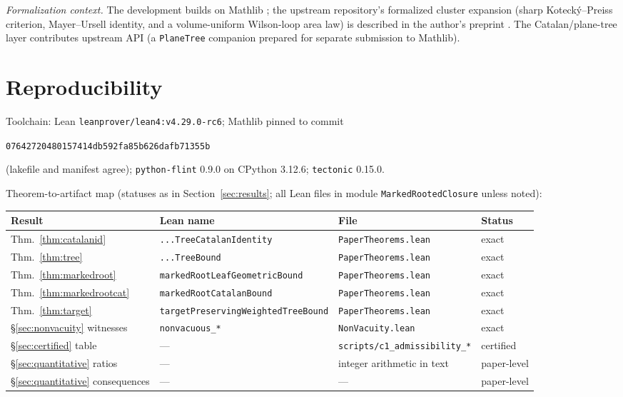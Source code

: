 \documentclass[11pt]{article}
\newcommand{\lean}[1]{\texttt{#1}}
\begin{document}
\emph{Formalization context.}  The development builds on Mathlib
\cite{mathlib20}; the upstream repository's formalized cluster
expansion (sharp Kotecký--Preiss criterion, Mayer--Ursell identity,
and a volume-uniform Wilson-loop area law) is described in the
author's preprint \cite{Eriksson26b}.  The Catalan/plane-tree layer
contributes upstream API (a \lean{PlaneTree} companion prepared for
separate submission to Mathlib).

\section{Reproducibility}\label{sec:repro}

Toolchain: Lean \lean{leanprover/lean4:v4.29.0-rc6}; Mathlib pinned
to commit
\begin{center}\small
\lean{07642720480157414db592fa85b626dafb71355b}
\end{center}
\noindent (lakefile and manifest agree); \lean{python-flint} 0.9.0 on
CPython 3.12.6; \lean{tectonic} 0.15.0.

\medskip
\noindent Theorem-to-artifact map (statuses as in
Section~\ref{sec:results}; all Lean files in module
\lean{MarkedRootedClosure} unless noted):

\begin{center}
\footnotesize
\begin{tabular}{@{}llll@{}}
\toprule
Result & Lean name & File & Status \\
\midrule
Thm.~\ref{thm:catalanid} & \lean{...TreeCatalanIdentity} & \lean{PaperTheorems.lean} & exact \\
Thm.~\ref{thm:tree} & \lean{...TreeBound} & \lean{PaperTheorems.lean} & exact \\
Thm.~\ref{thm:markedroot} & \lean{markedRootLeafGeometricBound} & \lean{PaperTheorems.lean} & exact \\
Thm.~\ref{thm:markedrootcat} & \lean{markedRootCatalanBound} & \lean{PaperTheorems.lean} & exact \\
Thm.~\ref{thm:target} & \lean{targetPreservingWeightedTreeBound} & \lean{PaperTheorems.lean} & exact \\
\S\ref{sec:nonvacuity} witnesses & \lean{nonvacuous\_*} & \lean{NonVacuity.lean} & exact \\
\S\ref{sec:certified} table & --- & \lean{scripts/c1\_admissibility\_*} & certified \\
\S\ref{sec:quantitative} ratios & --- & integer arithmetic in text & paper-level \\
\S\ref{sec:quantitative} consequences & --- & --- & paper-level \\
\bottomrule
\end{tabular}
\end{center}
\end{document}
